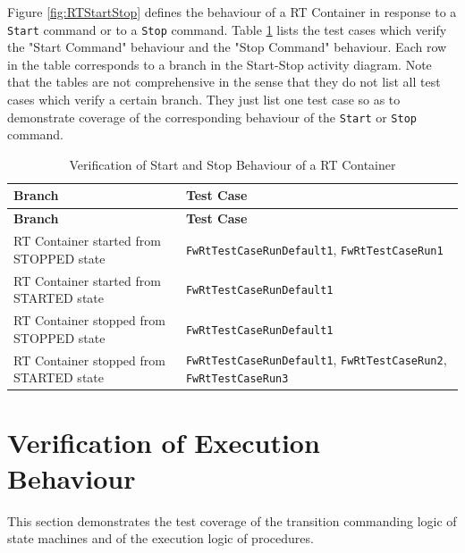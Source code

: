 \documentclass[a4paper,10pt]{article}
\let\stdsection\section
\renewcommand\section{\newpage\stdsection}
\begin{document}
\label{Appendix_C_RT_Start_Stop}
Figure \ref{fig:RTStartStop} defines the behaviour of a RT Container in response to a 
\texttt{Start} command or to a \texttt{Stop} command. Table \ref{tab:RT_StartStop} lists the test cases which verify the "Start Command" behaviour and the "Stop Command" behaviour. Each row in the table corresponds to a branch in the Start-Stop activity diagram. Note that the tables are not comprehensive in the sense that they do not list all test cases which verify a certain branch. They just list one test case so as to demonstrate coverage  of the corresponding behaviour of the \texttt{Start} or \texttt{Stop} command.

\begin{longtable}{|p{6.9cm}|p{4.3cm}|}
\caption{Verification of Start and Stop Behaviour of a RT Container}\label{tab:RT_StartStop} \\
\hline
\rowcolor{gray}
\textbf{Branch} & \textbf{Test Case} \\
\hline
\endfirsthead
\rowcolor{gray}
\textbf{Branch} & \textbf{Test Case} \\
\hline
\endhead
RT Container started from STOPPED state & \texttt{FwRtTestCaseRunDefault1}, \texttt{FwRtTestCaseRun1} \\
\hline
RT Container started from STARTED state & \texttt{FwRtTestCaseRunDefault1} \\
\hline
RT Container stopped from STOPPED state & \texttt{FwRtTestCaseRunDefault1} \\
\hline
RT Container stopped from STARTED state & \texttt{FwRtTestCaseRunDefault1}, \texttt{FwRtTestCaseRun2}, \texttt{FwRtTestCaseRun3} \\
\hline
\end{longtable}


\section{Verification of Execution Behaviour}
This section demonstrates the test coverage of the transition commanding logic
of state machines and of the execution logic of procedures.

\end{document}
